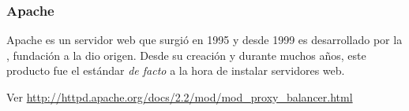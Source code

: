 \subsubsection{Apache}
\label{soa:tecnologias:apache}

Apache es un servidor web que surgió en 1995 y desde 1999 es desarrollado por la , fundación a la dio origen. Desde su creación y durante muchos años, este producto fue el estándar \textit{de facto} a la hora de instalar servidores web.


Ver \url{http://httpd.apache.org/docs/2.2/mod/mod_proxy_balancer.html}
